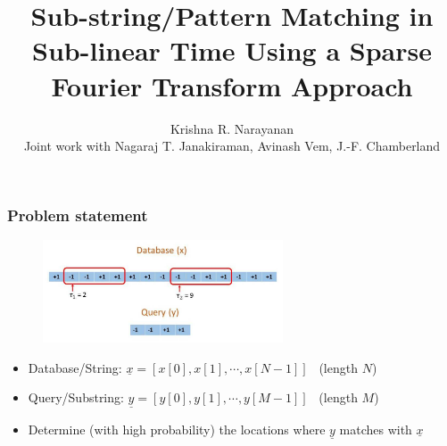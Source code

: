 \documentclass[10pt,xcolor=table]{beamer}
\newcommand{\xv}{\underline{x}}
\newcommand{\yv}{\underline{y}}
\begin{document}
\title{Sub-string/Pattern Matching in Sub-linear Time Using a Sparse Fourier Transform Approach}
\author{ Krishna R. Narayanan \\
Joint work with Nagaraj T. Janakiraman, Avinash Vem, J.-F. Chamberland \\
}
\date{}
\frame{\titlepage}
\begin{frame}\frametitle{Problem statement}
 	\vspace{-0.4cm}
	\begin{figure}[t]
		\centering
		\includegraphics[width=2.8in]{Pattern_matching_ex.pdf}
	\end{figure}
	\vspace{-10pt}
	\begin{block}{}
\begin{itemize}\itemsep5pt
	\item {\color{blue} Database/String}: $\xv = [x[0], x[1], \cdots, x[N-1]]$ \ (length $N$)
	\item { \color{blue} Query/Substring}: $\yv = [y[0], y[1], \cdots, y[M-1]]$ \ (length $M$)
    \item Determine ({\color{blue}with high probability}) the locations where $\yv$ matches with $\xv$ 
\end{itemize}
\end{block}


\end{frame}
\end{document}
